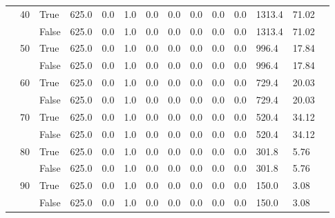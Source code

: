 \begin{landscape}
\begin{small}
\begin{longtable}[c]{@{}lll|ll|ll|ll|ll|lll@{}}
   & 40 & True  & 625.0           & 0.0            & 1.0           & 0.0           & 0.0           & 0.0           & 0.0           & 0.0           & 1313.4        & 71.02       &  \\
   &    & False & 625.0           & 0.0            & 1.0           & 0.0           & 0.0           & 0.0           & 0.0           & 0.0           & 1313.4        & 71.02       &  \\
   & 50 & True  & 625.0           & 0.0            & 1.0           & 0.0           & 0.0           & 0.0           & 0.0           & 0.0           & 996.4         & 17.84       &  \\
   &    & False & 625.0           & 0.0            & 1.0           & 0.0           & 0.0           & 0.0           & 0.0           & 0.0           & 996.4         & 17.84       &  \\
   & 60 & True  & 625.0           & 0.0            & 1.0           & 0.0           & 0.0           & 0.0           & 0.0           & 0.0           & 729.4         & 20.03       &  \\
   &    & False & 625.0           & 0.0            & 1.0           & 0.0           & 0.0           & 0.0           & 0.0           & 0.0           & 729.4         & 20.03       &  \\
   & 70 & True  & 625.0           & 0.0            & 1.0           & 0.0           & 0.0           & 0.0           & 0.0           & 0.0           & 520.4         & 34.12       &  \\
   &    & False & 625.0           & 0.0            & 1.0           & 0.0           & 0.0           & 0.0           & 0.0           & 0.0           & 520.4         & 34.12       &  \\
   & 80 & True  & 625.0           & 0.0            & 1.0           & 0.0           & 0.0           & 0.0           & 0.0           & 0.0           & 301.8         & 5.76        &  \\
   &    & False & 625.0           & 0.0            & 1.0           & 0.0           & 0.0           & 0.0           & 0.0           & 0.0           & 301.8         & 5.76        &  \\
   & 90 & True  & 625.0           & 0.0            & 1.0           & 0.0           & 0.0           & 0.0           & 0.0           & 0.0           & 150.0         & 3.08        &  \\
   &    & False & 625.0           & 0.0            & 1.0           & 0.0           & 0.0           & 0.0           & 0.0           & 0.0           & 150.0         & 3.08        &  \\

\end{longtable}
\end{small}
\end{landscape}
